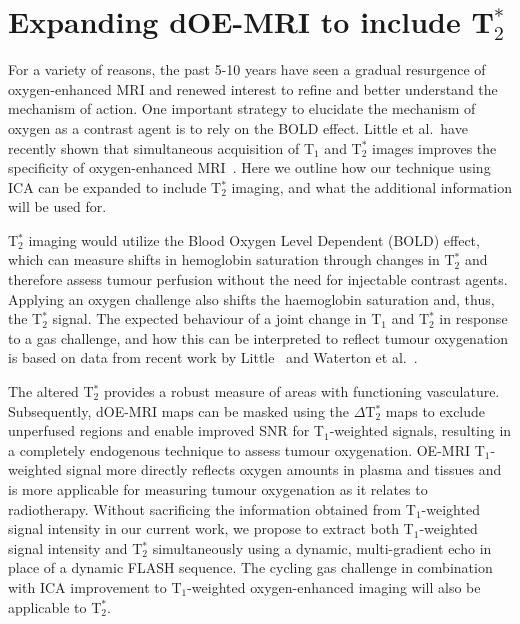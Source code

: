\section{Expanding \texorpdfstring{\acs{dOE-MRI}}{dOE-MRI} to include \texorpdfstring{T$_2^*$}{T2*}}
\label{futurework:expandingdOEMRI_T2*}

For a variety of reasons, the past 5-10 years have seen a gradual resurgence of oxygen-enhanced MRI and renewed interest to refine and better understand the mechanism of action.
One important strategy to elucidate the mechanism of oxygen as a contrast agent is to rely on the \acs{BOLD} effect. 
Little et al.\ have recently shown that simultaneous acquisition of T$_1$ and T$_2^*$ images improves the specificity of oxygen-enhanced MRI~\cite{Little:2018iu}.
Here we outline how our technique using \acs{ICA} can be expanded to include T$_2^*$ imaging, and what the additional information will be used for.

T$_2^*$ imaging would utilize the Blood Oxygen Level Dependent (\acs{BOLD}) effect, which can measure shifts in hemoglobin saturation through changes in T$_2^*$ and therefore assess tumour perfusion without the need for injectable contrast agents. 
Applying an oxygen challenge also shifts the haemoglobin saturation and, thus, the T$_2^*$ signal. 
The expected behaviour of a joint change in T$_1$ and T$_2^*$ in response to a gas challenge, and how this can be interpreted to reflect tumour oxygenation is based on data from recent work by Little~\cite{Little:2018iu} and Waterton et al.~\cite{OConnor:2019fc}. 

The altered T$_2^*$ provides a robust measure of areas with functioning vasculature. 
Subsequently, \acs{dOE-MRI} maps can be masked using the $\Delta$T$_2^*$ maps to exclude unperfused regions and enable improved \acs{SNR} for T$_1$-weighted signals, resulting in a completely endogenous technique to assess tumour oxygenation. 
OE-MRI T$_1$-weighted signal more directly reflects oxygen amounts in plasma and tissues and is more applicable for measuring tumour oxygenation as it relates to radiotherapy.
Without sacrificing the information obtained from T$_1$-weighted signal intensity in our current work, we propose to extract both T$_1$-weighted signal intensity and T$_2^*$ simultaneously using a dynamic, multi-gradient echo in place of a dynamic FLASH sequence. 
The cycling gas challenge in combination with \acs{ICA} improvement to T$_1$-weighted oxygen-enhanced imaging will also be applicable to T$_2^*$.

